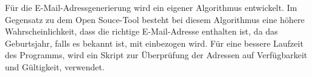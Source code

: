 Für die E-Mail-Adressgenerierung wird ein eigener Algorithmus entwickelt. Im Gegensatz zu dem Open Souce-Tool \cite{Bazzell} besteht bei diesem Algorithmus eine höhere Wahrscheinlichkeit, dass die richtige E-Mail-Adresse enthalten ist, da das Geburtsjahr, falls es bekannt ist, mit einbezogen wird. Für eine bessere Laufzeit des Programms, wird ein Skript zur Überprüfung der Adressen auf Verfügbarkeit und Gültigkeit, verwendet.

